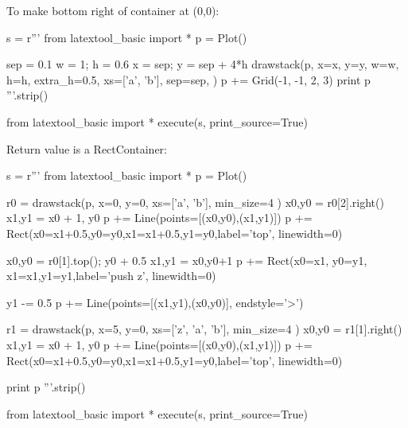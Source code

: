 \newpage
To make bottom right of container at (0,0):

\begin{python}
s = r'''
from latextool_basic import *
p = Plot()

sep = 0.1
w = 1; h = 0.6
x = sep; y = sep + 4*h
drawstack(p,
  x=x, y=y, w=w, h=h, extra_h=0.5, 
  xs=['a', 'b'],
  sep=sep,
  )
p += Grid(-1, -1, 2, 3)
print p
'''.strip()

from latextool_basic import *
execute(s, print_source=True)
\end{python}

\newpage

Return value is a RectContainer:

\begin{python}
s = r'''
from latextool_basic import *
p = Plot()

r0 = drawstack(p,
     x=0, y=0,
     xs=['a', 'b'],
     min_size=4
     )
x0,y0 = r0[2].right()
x1,y1 = x0 + 1, y0
p += Line(points=[(x0,y0),(x1,y1)])
p += Rect(x0=x1+0.5,y0=y0,x1=x1+0.5,y1=y0,label='top', linewidth=0)

x0,y0 = r0[1].top(); y0 + 0.5
x1,y1 = x0,y0+1
p += Rect(x0=x1, y0=y1, x1=x1,y1=y1,label='push z', linewidth=0)

y1 -= 0.5
p += Line(points=[(x1,y1),(x0,y0)], endstyle='>')

r1 = drawstack(p,
     x=5, y=0,
     xs=['z', 'a', 'b'],
     min_size=4
     )
x0,y0 = r1[1].right()
x1,y1 = x0 + 1, y0
p += Line(points=[(x0,y0),(x1,y1)])
p += Rect(x0=x1+0.5,y0=y0,x1=x1+0.5,y1=y0,label='top', linewidth=0)

print p
'''.strip()

from latextool_basic import *
execute(s, print_source=True)
\end{python}


